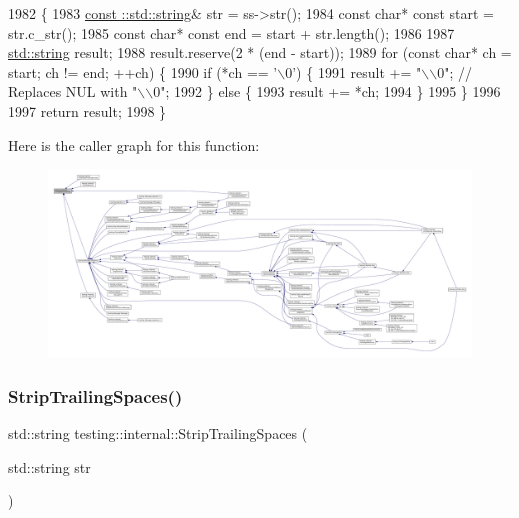 \begin{DoxyCode}
1982                                                     \{
1983   \hyperlink{namespacetesting_1_1internal_a8e8ff5b11e64078831112677156cb111}{const ::std::string}& str = ss->str();
1984   \textcolor{keyword}{const} \textcolor{keywordtype}{char}* \textcolor{keyword}{const} start = str.c\_str();
1985   \textcolor{keyword}{const} \textcolor{keywordtype}{char}* \textcolor{keyword}{const} end = start + str.length();
1986 
1987   \hyperlink{namespacetesting_1_1internal_a8e8ff5b11e64078831112677156cb111}{std::string} result;
1988   result.reserve(2 * (end - start));
1989   \textcolor{keywordflow}{for} (\textcolor{keyword}{const} \textcolor{keywordtype}{char}* ch = start; ch != end; ++ch) \{
1990     \textcolor{keywordflow}{if} (*ch == \textcolor{charliteral}{'\(\backslash\)0'}) \{
1991       result += \textcolor{stringliteral}{"\(\backslash\)\(\backslash\)0"};  \textcolor{comment}{// Replaces NUL with "\(\backslash\)\(\backslash\)0";}
1992     \} \textcolor{keywordflow}{else} \{
1993       result += *ch;
1994     \}
1995   \}
1996 
1997   \textcolor{keywordflow}{return} result;
1998 \}
\end{DoxyCode}
Here is the caller graph for this function\+:
\nopagebreak
\begin{figure}[H]
\begin{center}
\leavevmode
\includegraphics[width=350pt]{namespacetesting_1_1internal_ac0a2b7f69fc829d80a39e925b6417e39_icgraph}
\end{center}
\end{figure}
\mbox{\label{namespacetesting_1_1internal_aa6afda12e567c353e2e9b9c2e8cae14f}} 
\subsubsection{\texorpdfstring{Strip\+Trailing\+Spaces()}{StripTrailingSpaces()}}
{\footnotesize\ttfamily std\+::string testing\+::internal\+::\+Strip\+Trailing\+Spaces (\begin{DoxyParamCaption}\item[{std\+::string}]{str }\end{DoxyParamCaption})\hspace{0.3cm}{\ttfamily [inline]}}



